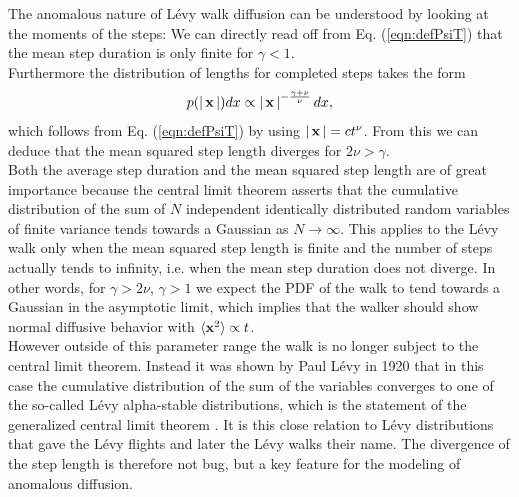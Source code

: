 The anomalous nature of L\'evy walk diffusion can be understood by looking at the moments of the steps: We can directly read off from Eq. (\ref{eqn:defPsiT}) that the mean step duration is only finite for $\gamma<1$.\\ 
Furthermore the distribution of lengths for completed steps takes the form 
%
\begin{align}
p(\left|\,\mathbf{ x }\,\right|) dx \propto \left|\,\mathbf{ x }\,\right|^{-\frac{\gamma+\nu}{\nu}} dx ,
\end{align}
%
which follows from Eq. (\ref{eqn:defPsiT}) by using $\left|\,\mathbf{ x }\,\right| = c t^{\nu}$. From this we can deduce that the mean squared step length diverges for $2\nu > \gamma$. \\
{\color{blue}
Both the average step duration and the mean squared step length are of great importance because the central limit theorem asserts that the cumulative distribution of the sum of $N$ independent identically distributed random variables of finite variance tends towards a Gaussian as $N \to \infty$. This applies to the L\'evy walk only when the mean squared step length is finite and the number of steps actually tends to infinity, i.e. when the mean step duration does not diverge. In other words, for $\gamma > 2 \nu$, $\gamma >1$ we expect the \gls{PDF} of the walk to tend towards a Gaussian in the asymptotic limit, which implies that the walker should show normal diffusive behavior with $\langle \mathbf{ x }^2 \rangle \propto t$. \\
However outside of this parameter range the walk is no longer subject to the central limit theorem. Instead it was shown by Paul L\'evy in 1920 that in this case the cumulative distribution of the sum of the variables converges to one of the so-called L\'evy alpha-stable distributions, which  is the statement of the generalized central limit theorem 
\cite{lwreview}. 
} 
It is this close relation to L\'evy distributions that gave the L\'evy flights and later the L\'evy walks their name. The divergence of the step length is therefore not bug, but a key feature for the modeling of anomalous diffusion. 

